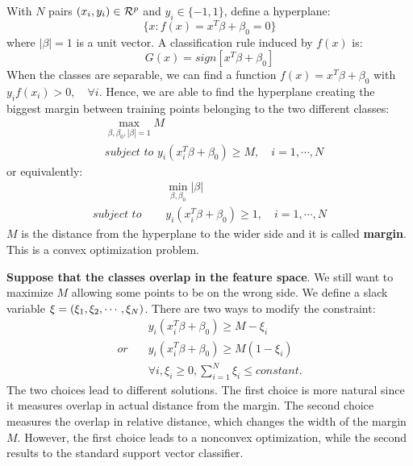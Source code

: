 \documentclass[12pt, letterpaper]{article}
\theoremstyle{definition}
\DeclarePairedDelimiter\autobracket{(}{)}
\newcommand{\br}[1]{\autobracket*{#1}}
\begin{document}
\subsubsection{}
With $N$ pairs $(x_i, y_i) \in \CMcal{R}^p$ and $y_i \in \{-1, 1\}$, define a hyperplane:
\begin{equation}
\{x: f(x) = x^T\beta+ \beta_0=0\}
\end{equation}
where $\left|\beta\right|=1$ is a unit vector. A classification rule induced by $f(x)$ is:
\begin{equation}
G(x) = sign\left[x^T\beta+\beta_0\right]
\end{equation}
When the classes are separable, we can find a function $f(x)=x^T\beta+\beta_0$ with $y_if(x_i)>0, \quad \forall i$. Hence, we are able to find the hyperplane creating the biggest margin between training points belonging to the two different classes:
\begin{equation}
\begin{aligned}
&\max_{\beta, \beta_0,\left|\beta\right|=1} M\\
&\textit{subject to } y_i(x_i^T\beta+\beta_0)\ge M,\quad i=1,\cdots,N
\end{aligned}
\end{equation}
or equivalently:
\begin{equation}
\begin{aligned}
&\min_{\beta, \beta_0} \left|\beta\right|\\
\textit{subject to } \quad&y_i(x_i^T\beta+\beta_0)\ge 1,\quad i=1,\cdots,N
\end{aligned}
\end{equation}
$M$ is the distance from the hyperplane to the wider side and it is called \textbf{margin}. This is a convex optimization problem.


\textbf{Suppose that the classes overlap in the feature space}. We still want to maximize $M$ allowing some points to be on the wrong side. We define a slack variable $\xi=\br{\xi_1, \xi_2, \cdots, \xi_N}$. There are two ways to modify the constraint:
\begin{equation}
\begin{aligned}
&y_i (x_i^T\beta+\beta_0)\ge M -\xi_i\\
\textit{or} \quad&y_i (x_i^T\beta+\beta_0)\ge M (1-\xi_i)\\
&\forall i, \xi_i\ge  0, \sum_{i=1}^N \xi_i \le constant.
\end{aligned}
\end{equation}
The two choices lead to different solutions. The first choice is more natural since it measures overlap in actual distance from the margin. The second choice measures the overlap in relative distance, which changes the width of the margin $M$. However, the first choice leads to a nonconvex optimization, while the second results to the standard support vector classifier.
\end{document}
